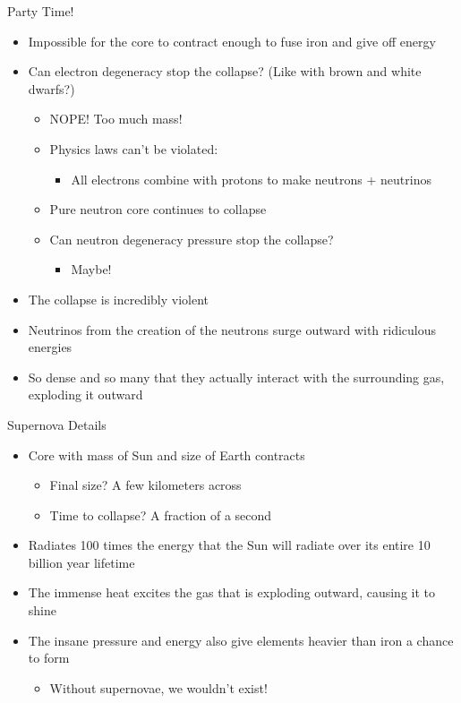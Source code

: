 \documentclass[pdf,aspectratio=169]{beamer}
\begin{document}
\begin{frame}{Party Time!}
  \begin{itemize}
	\item Impossible for the core to contract enough to fuse iron and give off energy
	\item Can electron degeneracy stop the collapse? (Like with brown and white dwarfs?)
	  \begin{itemize}
		\item NOPE! Too much mass!
		\item Physics laws can't be violated:
		  \begin{itemize}
			\item All electrons combine with protons to make neutrons + neutrinos
		  \end{itemize}
		\item Pure neutron core continues to collapse
		\item Can neutron degeneracy pressure stop the collapse?
		  \begin{itemize}
			\item Maybe!
		  \end{itemize}
	  \end{itemize}
	\item The collapse is incredibly violent
	\item Neutrinos from the creation of the neutrons surge outward with ridiculous energies
	\item So dense and so many that they actually interact with the surrounding gas, exploding it outward
  \end{itemize}
\end{frame}

\begin{frame}{Supernova Details}
  \begin{itemize}
	\item Core with mass of Sun and size of Earth contracts
	  \begin{itemize}
		\item Final size? A few kilometers across
		\item Time to collapse? A fraction of a second
	  \end{itemize}
	\item Radiates 100 times the energy that the Sun will radiate \alert{over its entire 10 billion year lifetime}
	\item The immense heat excites the gas that is exploding outward, causing it to shine
	\item The insane pressure and energy also give elements heavier than iron a chance to form
	  \begin{itemize}
		\item Without supernovae, we wouldn't exist!
	  \end{itemize}
  \end{itemize}
\end{frame}
\end{document}
